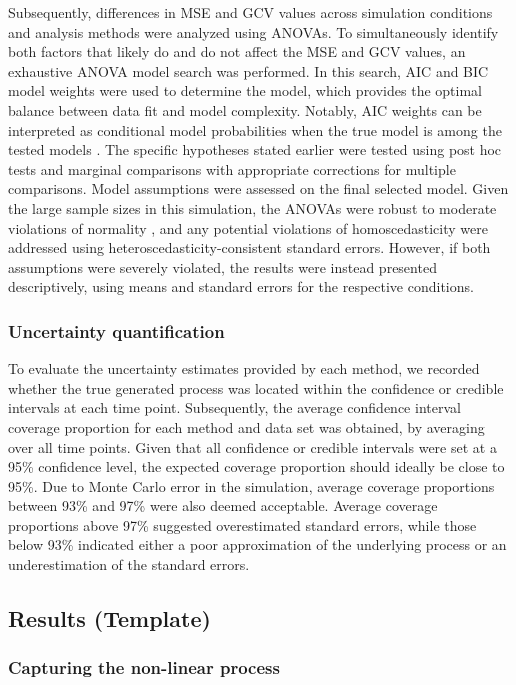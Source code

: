\documentclass[man, floatsintext]{apa7}
\begin{document}
Subsequently, differences in MSE and GCV values across simulation conditions
and analysis methods were analyzed using ANOVAs. To simultaneously
identify both factors that likely do and do not affect the MSE and GCV values,
an exhaustive ANOVA model search was performed. In this search, AIC and BIC
model weights were used to determine the model, which provides the optimal
balance between data fit and model complexity. Notably, AIC weights can
be interpreted as conditional model probabilities when the true model is among
the tested models \parencite{wagenmakers_aic_2004}. The specific hypotheses
stated earlier
were tested using post hoc tests and marginal comparisons with appropriate
corrections for multiple comparisons.
Model assumptions were assessed on the final selected model. Given
the large sample sizes in this simulation, the ANOVAs were robust to moderate
violations of normality \parencite{blanca_non-normal_2017},
and any potential violations of homoscedasticity were
addressed using heteroscedasticity-consistent standard errors. However, if both
assumptions were severely violated, the results were instead presented
descriptively, using means and standard errors for the respective conditions.

\subsubsection{Uncertainty quantification}

To evaluate the uncertainty estimates provided by each method, we recorded
whether the true generated process was located within the confidence or
credible intervals at each time point. Subsequently, the average
confidence interval coverage proportion for each method and data set was
obtained, by averaging over all time points.
Given that all confidence or credible intervals were set at a
95\% confidence level, the expected coverage proportion should ideally be
close to 95\%. Due to Monte Carlo error in the simulation, average coverage
proportions between 93\% and 97\% were also deemed acceptable.
Average coverage proportions above 97\% suggested overestimated standard
errors,
while those below 93\% indicated either a poor approximation of the underlying
process or an underestimation of the standard errors.

\subsection{Results (Template)}

\subsubsection{Capturing the non-linear process}
\end{document}
